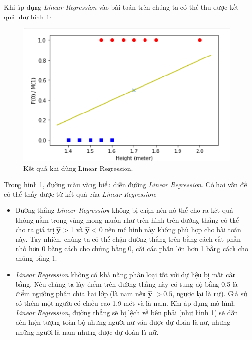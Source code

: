 Khi áp dụng \textit{Linear Regression} vào bài toán trên chúng ta có thể thu được kết quả như hình \ref{fig:lr_result}:
\clearpage
\begin{figure}[!ht]
    \centering
    \includegraphics[width=\textwidth,height=\textheight,keepaspectratio]{books/artificial-neural-network/chapter02/figure/LN_result.PNG}
    \caption{Kết quả khi dùng Linear Regression.}
    \label{fig:lr_result}
\end{figure}

Trong hình \ref{fig:lr_result}, đường màu vàng biểu diễn đường \textit{Linear Regression}. Có hai vấn đề có thể thấy được từ kết quả của \textit{Linear Regression}:

\begin{itemize}
    \item Đường thẳng \textit{Linear Regression} không bị chặn nên nó thể cho ra kết quả không nằm trong vùng mong muốn như trên hình trên đường thẳng có thể cho ra giá trị $\mathbf{\hat{y}}$ > 1 và $\mathbf{\hat{y}}$ < 0 nên mô hình này không phù hợp cho bài toán này. Tuy nhiên, chúng ta có thể chặn đường thẳng trên bằng cách cắt phần nhỏ hơn 0 bằng cách cho chúng bằng 0, cắt các phần lớn hơn 1 bằng cách cho chúng bằng 1.
    \item \textit{Linear Regression} không có khả năng phân loại tốt với dự liệu bị mất cân bằng. Nếu chúng ta lấy điểm trên đường thẳng này có tung độ bằng 0.5 là điểm ngưỡng phân chia hai lớp (là nam nếu $\mathbf{\hat{y}}$ $> 0.5$, ngược lại là nữ). Giả sử có thêm một người có chiều cao 1.9 mét và là nam. Khi áp dụng mô hình \textit{Linear Regression}, đường thẳng sẽ bị lệch về bên phải (như hình \ref{fig:lr_result}) sẽ dẫn đến hiện tượng toàn bộ những người nữ vẫn được dự đoán là nữ, nhưng những người là nam nhưng được dự đoán là nữ.
\end{itemize}

